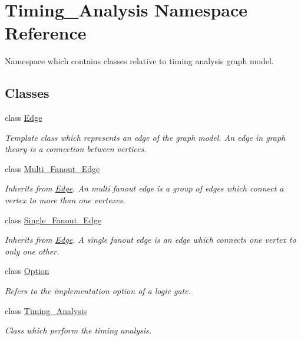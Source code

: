 \hypertarget{namespaceTiming__Analysis}{\section{Timing\-\_\-\-Analysis Namespace Reference}
\label{namespaceTiming__Analysis}
}


Namespace which contains classes relative to timing analysis graph model.  


\subsection*{Classes}
\begin{DoxyCompactItemize}
\item 
class \hyperlink{classTiming__Analysis_1_1Edge}{Edge}
\begin{DoxyCompactList}\small\item\em Template class which represents an edge of the graph model. An edge in graph theory is a connection between vertices. \end{DoxyCompactList}\item 
class \hyperlink{classTiming__Analysis_1_1Multi__Fanout__Edge}{Multi\-\_\-\-Fanout\-\_\-\-Edge}
\begin{DoxyCompactList}\small\item\em Inherits from \hyperlink{classTiming__Analysis_1_1Edge}{Edge}. An multi fanout edge is a group of edges which connect a vertex to more than one vertexes. \end{DoxyCompactList}\item 
class \hyperlink{classTiming__Analysis_1_1Single__Fanout__Edge}{Single\-\_\-\-Fanout\-\_\-\-Edge}
\begin{DoxyCompactList}\small\item\em Inherits from \hyperlink{classTiming__Analysis_1_1Edge}{Edge}. A single fanout edge is an edge which connects one vertex to only one other. \end{DoxyCompactList}\item 
class \hyperlink{classTiming__Analysis_1_1Option}{Option}
\begin{DoxyCompactList}\small\item\em Refers to the implementation option of a logic gate. \end{DoxyCompactList}\item 
class \hyperlink{classTiming__Analysis_1_1Timing__Analysis}{Timing\-\_\-\-Analysis}
\begin{DoxyCompactList}\small\item\em Class which perform the timing analysis. \end{DoxyCompactList}\item 

\end{DoxyCompactItemize}
